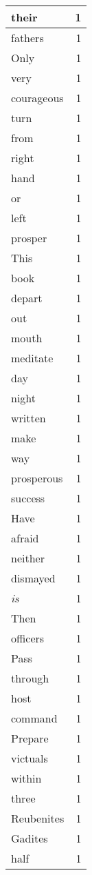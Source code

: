 \begin{center}
\begin{longtable}{l|r}
their & 1 \\ \hline
fathers & 1 \\ \hline
Only & 1 \\ \hline
very & 1 \\ \hline
courageous & 1 \\ \hline
turn & 1 \\ \hline
from & 1 \\ \hline
right & 1 \\ \hline
hand & 1 \\ \hline
or & 1 \\ \hline
left & 1 \\ \hline
prosper & 1 \\ \hline
This & 1 \\ \hline
book & 1 \\ \hline
depart & 1 \\ \hline
out & 1 \\ \hline
mouth & 1 \\ \hline
meditate & 1 \\ \hline
day & 1 \\ \hline
night & 1 \\ \hline
written & 1 \\ \hline
make & 1 \\ \hline
way & 1 \\ \hline
prosperous & 1 \\ \hline
success & 1 \\ \hline
Have & 1 \\ \hline
afraid & 1 \\ \hline
neither & 1 \\ \hline
dismayed & 1 \\ \hline
\emph{is} & 1 \\ \hline
Then & 1 \\ \hline
officers & 1 \\ \hline
Pass & 1 \\ \hline
through & 1 \\ \hline
host & 1 \\ \hline
command & 1 \\ \hline
Prepare & 1 \\ \hline
victuals & 1 \\ \hline
within & 1 \\ \hline
three & 1 \\ \hline
Reubenites & 1 \\ \hline
Gadites & 1 \\ \hline
half & 1 \\ \hline

\end{longtable}
\end{center}
